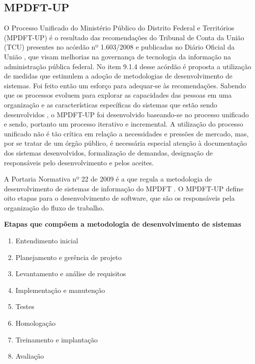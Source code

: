 \documentclass[
	article,			%
	11pt,				%
	oneside,			%
	a4paper,			%
	english,			%
	brazil,				%
	sumario=tradicional
	]{abntex2}
\begin{document}
\subsection{MPDFT-UP}

O Processo Unificado do Ministério Público do Distrito Federal e Territórios
(MPDFT-UP) \cite{mpdft-up} é o resultado das recomendações do Tribunal de Conta
da União (TCU) presentes no acórdão nº 1.603/2008 \cite{acordao-tcu-1603-2008}
e publicadas no Diário Oficial da União \cite{dou-20080818}, que visam
melhorias na governança de tecnologia da informação na administração pública
federal. No item 9.1.4 desse acórdão é proposta a utilização de medidas que
estimulem a adoção de metodologias de desenvolvimento de sistemas. Foi feito
então um esforço para adequar-se às recomendações. Sabendo que os processos
evoluem para explorar as capacidades das pessoas em uma organização e as
características específicas do sistemas que estão sendo desenvolvidos
\cite{sommerville2007}, o MPDFT-UP foi desenvolvido baseando-se no processo
unificado e sendo, portanto um processo iterativo e incremental. A utilização do
processo unificado não é tão crítica em relação a necessidades e pressões de
mercado, mas, por se tratar de um órgão público, é necessária especial atenção
à documentação dos sistemas desenvolvidos, formalização de demandas, designação
de responsáveis pelo desenvolvimento e pelos aceites.

A Portaria Normativa nº 22 de 2009 é a que regula a metodologia de
desenvolvimento de sistemas de informação do MPDFT \cite{portaria-22-2009}. O
MPDFT-UP define oito etapas para o desenvolvimento de software, que são os
responsáveis pela organização do fluxo de trabalho.

\textbf{Etapas que compõem a metodologia de desenvolvimento de sistemas}

\begin{enumerate}
   \item Entendimento inicial
   \item Planejamento e gerência de projeto
   \item Levantamento e análise de requisitos
   \item Implementação e manutenção
   \item Testes
   \item Homologação
   \item Treinamento e implantação
   \item Avaliação
\end{enumerate}
\end{document}
